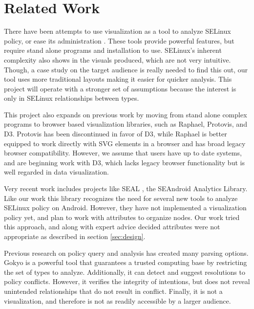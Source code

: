 \documentclass[conference]{IEEEtran}
\begin{document}
\section{Related Work}\label{sec:related}
There have been attempts to use visualization as a tool to analyze SELinux policy, or ease its administration \cite{marouf2011segrapher,xu2008visualization}. These tools provide powerful features, but require stand alone programs and installation to use. SELinux's inherent complexity also shows in the visuals produced, which are not very intuitive. Though, a case study on the target audience is really needed to find this out, our tool uses more traditional layouts making it easier for quicker analysis. This project will operate with a stronger set of assumptions because the interest is only in SELinux relationships between types. 

This project also expands on previous work by moving from stand alone complex programs to browser based visualization libraries, such as Raphael\cite{baranovskiy2011raphael}, Protovis\cite{bostock2009protovis}, and D3\cite{bostock2012d3}. Protovis has been discontinued in favor of D3, while Raphael is better equipped to work directly with SVG elements in a browser and has broad legacy browser compatibility. However, we assume that users have up to date systems, and are beginning work with D3, which lacks legacy browser functionality but is well regarded in data visualization.

Very recent work includes projects like SEAL \cite{reshetova2015characterizing}, the SEAndroid Analytics Library. Like our work this library recognizes the need for several new tools to analyze SELinux policy on Android. However, they have not implemented a visualization policy yet, and plan to work with attributes to organize nodes. Our work tried this approach, and along with expert advice decided attributes were not appropriate as described in section \ref{sec:design}.

Previous research on policy query and analysis \cite{archer2003analyzing,marouf2011segrapher,jaeger2003analyzing,zanin2004towards} has created many parsing options. Gokyo\cite{jaeger2003analyzing} is a powerful tool that guarantees a trusted computing base by restricting the set of types to analyze. Additionally, it can detect and suggest resolutions to policy conflicts. However, it verifies the integrity of intentions, but does not reveal unintended relationships that do not result in conflict. Finally, it is not a visualization, and therefore is not as readily accessible by a larger audience. 
\end{document}
